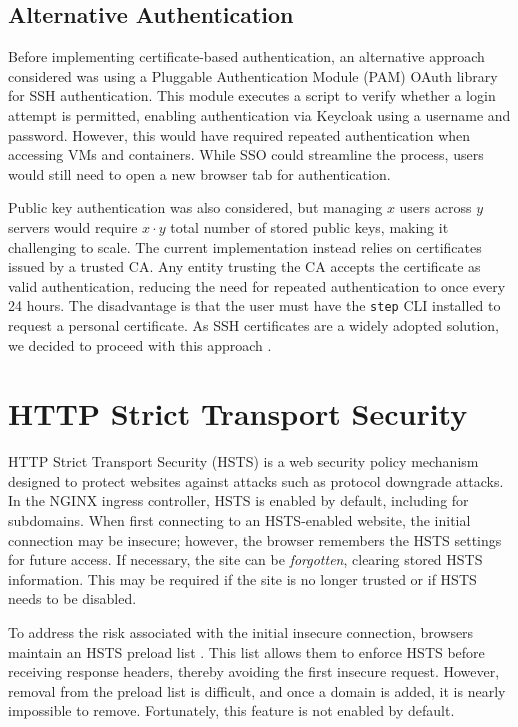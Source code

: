 \subsection{Alternative Authentication}
Before implementing certificate-based authentication, an alternative approach considered was using a Pluggable Authentication Module (PAM) OAuth library for SSH authentication. This module executes a script to verify whether a login attempt is permitted, enabling authentication via Keycloak using a username and password. However, this would have required repeated authentication when accessing VMs and containers. While SSO could streamline the process, users would still need to open a new browser tab for authentication. 

Public key authentication was also considered, but managing $x$ users across $y$ servers would require $x \cdot y$ total number of stored public keys, making it challenging to scale. The current implementation instead relies on certificates issued by a trusted CA. Any entity trusting the CA accepts the certificate as valid authentication, reducing the need for repeated authentication to once every 24 hours. The disadvantage is that the user must have the \texttt{step} CLI installed to request a personal certificate. As SSH certificates are a widely adopted solution, we decided to proceed with this approach \parencite{smallstep_ssh_certificates}.

\section{HTTP Strict Transport Security}
HTTP Strict Transport Security (HSTS) is a web security policy mechanism designed to protect websites against attacks such as protocol downgrade attacks. In the NGINX ingress controller, HSTS is enabled by default, including for subdomains. When first connecting to an HSTS-enabled website, the initial connection may be insecure; however, the browser remembers the HSTS settings for future access. If necessary, the site can be \textit{forgotten}, clearing stored HSTS information. This may be required if the site is no longer trusted or if HSTS needs to be disabled.

To address the risk associated with the initial insecure connection, browsers maintain an HSTS preload list \parencite{hstspreload}. This list allows them to enforce HSTS before receiving response headers, thereby avoiding the first insecure request. However, removal from the preload list is difficult, and once a domain is added, it is nearly impossible to remove. Fortunately, this feature is not enabled by default.

